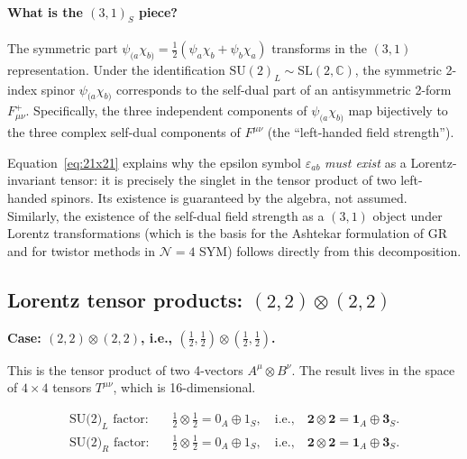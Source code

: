 \paragraph{What is the $(3,1)_S$ piece?}
The symmetric part $\psi_{(a}\chi_{b)} = \tfrac{1}{2}(\psi_a\chi_b + \psi_b\chi_a)$
transforms in the $(3,1)$ representation.  Under the identification
$\mathrm{SU}(2)_L \sim \mathrm{SL}(2,\mathbb{C})$, the symmetric 2-index spinor
$\psi_{(a}\chi_{b)}$ corresponds to the self-dual part of an antisymmetric
2-form $F^+_{\mu\nu}$.  Specifically, the three independent components of
$\psi_{(a}\chi_{b)}$ map bijectively to the three complex self-dual components
of $F^{\mu\nu}$ (the ``left-handed field strength'').

\begin{physinterp}
  Equation~\eqref{eq:21x21} explains why the epsilon symbol $\varepsilon_{ab}$
  \emph{must exist} as a Lorentz-invariant tensor: it is precisely the singlet
  in the tensor product of two left-handed spinors.  Its existence is
  guaranteed by the algebra, not assumed.  Similarly, the existence of the
  self-dual field strength as a $(3,1)$ object under Lorentz transformations
  (which is the basis for the Ashtekar formulation of GR and for twistor methods
  in $\mathcal{N}=4$ SYM) follows directly from this decomposition.
\end{physinterp}

\subsection{Lorentz tensor products: \texorpdfstring{$(2,2)\otimes(2,2)$}{(2,2)x(2,2)}}

\noindent\textbf{Case: $(2,2)\otimes(2,2)$, i.e., $(\tfrac{1}{2},\tfrac{1}{2})\otimes(\tfrac{1}{2},\tfrac{1}{2})$.}

This is the tensor product of two 4-vectors $A^\mu \otimes B^\nu$.
The result lives in the space of $4\times 4$ tensors $T^{\mu\nu}$, which is 16-dimensional.

\begin{align*}
  \text{SU(2)}_L\text{ factor:} &\quad
  \tfrac{1}{2}\otimes\tfrac{1}{2} = 0_A \oplus 1_S,
  \quad\text{i.e.,}\quad \mathbf{2}\otimes\mathbf{2} = \mathbf{1}_A \oplus \mathbf{3}_S.\\[3pt]
  \text{SU(2)}_R\text{ factor:} &\quad
  \tfrac{1}{2}\otimes\tfrac{1}{2} = 0_A \oplus 1_S,
  \quad\text{i.e.,}\quad \mathbf{2}\otimes\mathbf{2} = \mathbf{1}_A \oplus \mathbf{3}_S.
\end{align*}

